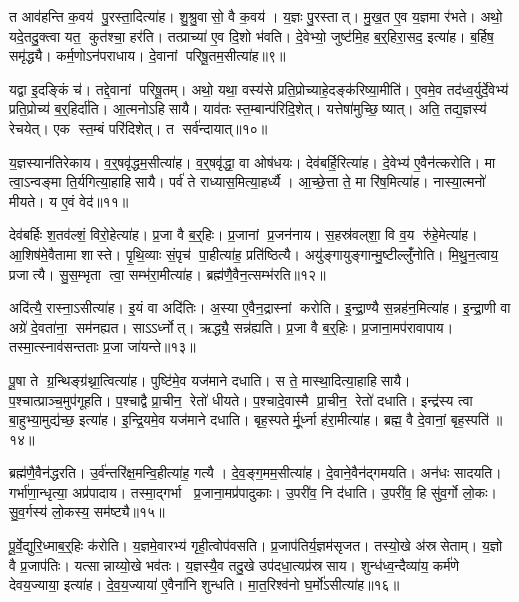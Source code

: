 त आव॑हन्ति क॒वय॑ पु॒रस्ता॒दित्या॑ह।
शु॒श्रु॒वासो॒ वै क॒वय॑।
य॒ज्ञः पु॒रस्तात्।
मु॒ख॒त ए॒व य॒ज्ञमा र॑भते।
अथो॒ यदे॒तदु॒क्त्वा यत॒ कुत॑श्चा॒ हर॑ति।
तत्प्राच्या॑ ए॒व दि॒शो भ॑वति।
दे॒वेभ्यो॒ जुष्ट॑मि॒ह ब॒र्॒हिरा॒सद॒ इत्या॑ह।
ब॒र्\mbox{}हिष॒ समृ॑द्ध्यै।
कर्म॒णोऽन॑पराधाय।
दे॒वानां परिषू॒तम॒सीत्या॑ह॥९॥

यद्वा इ॒दङ्किं च॑।
तद्दे॒वानां परिषू॒तम्।
अथो॒ यथा॒ वस्य॑से प्रति॒प्रोच्याहे॒दङ्क॑रिष्या॒मीति॑।
ए॒वमे॒व तद॑ध्व॒र्युर्दे॒वेभ्य॑ प्रति॒प्रोच्य॑ ब॒र्॒हिर्दा॑ति।
आ॒त्मनोऽहिसायै।
याव॑तः स्त॒म्बान्प॑रिदि॒शेत्।
यत्तेषा॑मुच्छि॒ष्यात्।
अति॒ तद्य॒ज्ञस्य॑ रेचयेत्।
एक स्त॒म्बं परि॑दिशेत्।
त सर्व॑न्दायात्॥१०॥

य॒ज्ञस्यान॑तिरेकाय।
व॒र्॒षवृ॑द्धम॒सीत्या॑ह।
व॒र्॒षवृ॑द्धा॒ वा ओष॑धयः।
देव॑बर्\mbox{}हि॒रित्या॑ह।
दे॒वेभ्य॑ ए॒वैन॑त्करोति।
मा त्वा॒ऽन्वङ्मा ति॒र्यगित्या॒हाहिसायै।
पर्व॑ ते राध्यास॒मित्या॒हर्ध्यै।
आ॒च्छे॒त्ता ते॒ मा रि॑ष॒मित्या॑ह।
नास्या॒त्मनो॑ मीयते।
य ए॒वं वेद॑॥११॥

देव॑बर्\mbox{}हिः श॒तव॑ल्\mbox{}शं॒ विरो॒हेत्या॑ह।
प्र॒जा वै ब॒र्॒हिः।
प्र॒जानां प्र॒जन॑नाय।
स॒हस्र॑वल्‌शा॒ वि व॒य रु॑हे॒मेत्या॑ह।
आ॒शिष॑मे॒वैतामा शास्ते।
पृ॒थि॒व्याः सं॒पृच॑ पा॒हीत्या॑ह॒ प्रति॑ष्ठित्यै।
अयु॑ङ्गायुङ्गान्मु॒ष्टील्लुँ॑नोति।
मि॒थु॒न॒त्वाय॒ प्रजात्यै।
सु॒स॒म्भृता त्वा॒ सम्भ॑रा॒मीत्या॑ह।
ब्रह्म॑णै॒वैन॒त्सम्भ॑रति॥१२॥

अदि॑त्यै॒ रास्ना॒ऽसीत्या॑ह।
इ॒यं वा अदि॑तिः।
अ॒स्या ए॒वैन॒द्रास्नां करोति।
इ॒न्द्रा॒ण्यै स॒न्नह॑न॒मित्या॑ह।
इ॒न्द्रा॒णी वा अग्रे॑ दे॒वता॑ना॒ सम॑नह्यत।
साऽऽर्ध्नोत्।
ऋद्ध्यै॒ सन्न॑ह्यति।
प्र॒जा वै ब॒र्॒हिः।
प्र॒जाना॒मप॑रावापाय।
तस्मा॒त्स्नाव॑सन्तताः प्र॒जा जा॑यन्ते॥१३॥

पू॒षा ते ग्र॒न्थिङ्ग्र॑थ्ना॒त्वित्या॑ह।
पुष्टि॑मे॒व यज॑माने दधाति।
स ते॒ मास्था॒दित्या॒हाहिसायै।
प॒श्चात्प्राञ्च॒मुप॑गूहति।
प॒श्चाद्वै प्रा॒चीन॒ रेतो॑ धीयते।
प॒श्चादे॒वास्मै प्रा॒चीन॒ रेतो॑ दधाति।
इन्द्र॑स्य त्वा बा॒हुभ्या॒मुद्य॑च्छ॒ इत्या॑ह।
इ॒न्द्रि॒यमे॒व यज॑माने दधाति।
बृह॒स्पतेर्मू॒र्ध्ना ह॑रा॒मीत्या॑ह।
ब्रह्म॒ वै दे॒वानां॒ बृह॒स्पति॑॥१४॥

ब्रह्म॑णै॒वैन॑द्धरति।
उ॒र्व॑न्तरि॑क्ष॒मन्वि॒हीत्या॑ह॒ गत्यै।
दे॒व॒ङ्ग॒मम॒सीत्या॑ह।
दे॒वाने॒वैन॑द्गमयति।
अन॑धः सादयति।
गर्भा॑णा॒न्धृत्या॒ अप्र॑पादाय।
तस्मा॒द्गर्भा प्र॒जाना॒मप्र॑पादुकाः।
उ॒परी॑व॒ नि द॑धाति।
उ॒परी॑व॒ हि सु॑व॒र्गो लो॒कः।
सु॒व॒र्गस्य॑ लो॒कस्य॒ सम॑ष्ट्यै॥१५॥\anuvakamend[स॒यो॒नि॒त्वाय॑ स्व॒धाकृ॑ता॒ऽसीत्या॑ह दाया॒द्वेद॑ भरति जायन्ते॒ बृह॒स्पति॒ सम॑ष्ट्यै]

पू॒र्वे॒द्युरि॒ध्माब॒र्॒हिः क॑रोति।
य॒ज्ञमे॒वारभ्य॑ गृही॒त्वोप॑वसति।
प्र॒जाप॑तिर्य॒ज्ञम॑सृजत।
तस्यो॒खे अ॑स्रसेताम्।
य॒ज्ञो वै प्र॒जाप॑तिः।
यत्सान्नाय्यो॒खे भव॑तः।
य॒ज्ञस्यै॒व तदु॒खे उप॑दधा॒त्यप्र॑स्रसाय।
शुन्ध॑ध्व॒न्दैव्या॑य॒ कर्म॑णे देवय॒ज्याया॒ इत्या॑ह।
दे॒व॒य॒ज्याया॑ ए॒वैना॑नि शुन्धति।
मा॒त॒रिश्व॑नो घ॒र्मो॑ऽसीत्या॑ह॥१६॥

